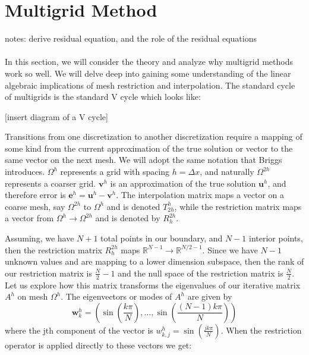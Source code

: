 \documentclass[pdftex,12pt,a4paper]{article}
\begin{document}
\section{Multigrid Method}

notes: 
derive residual equation, and the role of the residual equations



\paragraph{} In this section, we will consider the theory and analyze why multigrid methods work so well.  We will delve deep into gaining some understanding of the linear algebraic implications of mesh restriction and interpolation.  The standard cycle of multigrids is the standard V cycle which looks like: 

[insert diagram of a V cycle]

Transitions from one discretization to another discretization require a mapping of some kind from the current approximation of the true solution or vector to the same vector on the next mesh.  We will adopt the same notation that Briggs introduces. $\Omega^{h}$ represents a grid with spacing $h = \Delta x $, and naturally $\Omega^{2h}$ represents a coarser grid.   $\mathbf{v}^h$ is an approximation of the true solution $\mathbf{u}^h$, and therefore error is $\mathbf{e}^h = \mathbf{u}^h - \mathbf{v}^h$.  The interpolation matrix maps a vector on a coarse mesh, say $\Omega^{2h}$ to $\Omega^{h}$ and is denoted $T_{2h}^h$, while the restriction matrix maps a vector from $\Omega^{h} \rightarrow \Omega^{2h}$ and is denoted by $R_h^{2h}$.  

Assuming, we have $N+1$ total points in our boundary, and $N-1$ interior points, then the restriction matrix $R_h^{2h}$ maps $\mathbb{R}^{N-1} \rightarrow \mathbb{R}^{N/2 -1}$.  Since we have $N-1$ unknown values and are mapping to a lower dimension subspace, then the rank of our restriction matrix is $\frac{N}{2} -1 $ and the null space of the restriction matrix is $\frac{N}{2}$.  Let us explore how this matrix transforms the eigenvalues of our iterative matrix $A^h$ on mesh $\Omega^h$.  The eigenvectors or modes of $A^h$ are given by 
$$\mathbf{w}_{k}^h = \left( \sin\left( \frac{k \pi}{N}\right), \dots, \sin\left( \frac{(N-1)k \pi}{N}\right) \right)$$ where the jth component of the vector is $w_{k,j}^h = \sin\left( \frac{jk \pi}{N}\right)$.  When the restriction operator is applied directly to these vectors we get: 
\end{document}
